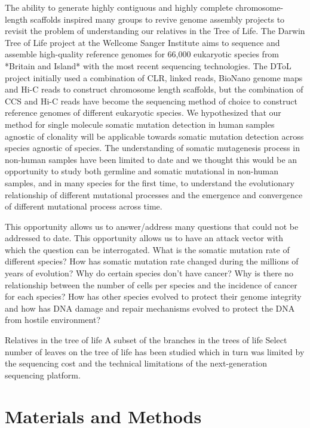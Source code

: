 The ability to generate highly contiguous and highly complete chromosome-length scaffolds inspired many groups to revive genome assembly projects to revisit the problem of understanding our relatives in the Tree of Life. The Darwin Tree of Life project at the Wellcome Sanger Institute aims to sequence and assemble high-quality reference genomes for 66,000 eukaryotic species from *Britain and Island* with the most recent sequencing technologies. The DToL project initially used a combination of CLR, linked reads, BioNano genome maps and Hi-C reads to construct chromosome length scaffolds, but the combination of CCS and Hi-C reads have become the sequencing method of choice to construct reference genomes of different eukaryotic species. We hypothesized that our method for single molecule somatic mutation detection in human samples agnostic of clonality will be applicable towards somatic mutation detection across species agnostic of species. The understanding of somatic mutagenesis process in non-human samples have been limited to date and we thought this would be an opportunity to study both germline and somatic mutational in non-human samples, and in many species for the first time, to understand the evolutionary relationship of different mutational processes and the emergence and convergence of different mutational process across time.

This opportunity allows us to answer/address many questions that could not be addressed to date. This opportunity allows us to have an attack vector with which the question can be interrogated. What is the somatic mutation rate of different species? How has somatic mutation rate changed during the millions of years of evolution? Why do certain species don’t have cancer? Why is there no relationship between the number of cells per species and the incidence of cancer for each species? How has other species evolved to protect their genome integrity and how has DNA damage and repair mechanisms evolved to protect the DNA from hostile environment? 


Relatives in the tree of life
A subset of the branches in the trees of life
Select number of leaves on the tree of life has been studied
which in turn was limited by the sequencing cost and the technical limitations of the next-generation sequencing platform. 

\section{Materials and Methods}

